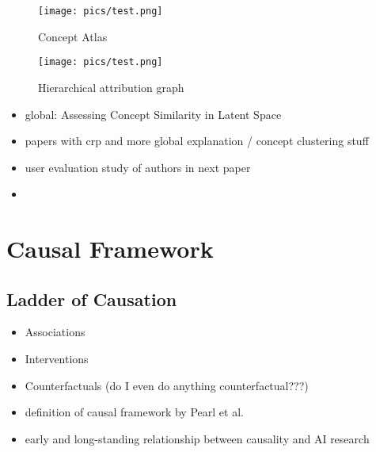 \begin{figure}[htbp]
    \centering
	\texttt{[image: pics/test.png]}
    \caption{Concept Atlas}
    \label{fig:concept_atlas}
\end{figure}

\begin{figure}[htbp]
    \centering
	\texttt{[image: pics/test.png]}
    \caption{Hierarchical attribution graph}
    \label{fig:attr_graph}
\end{figure}

\begin{itemize}
    \item global: Assessing Concept Similarity in Latent Space
    \item papers with crp and more global explanation / concept clustering stuff 
\cite{Vielhaben2022,Vielhaben2023,Dreyer2023,Dreyer2023a,Fel2023,Fel2023a,Pahde2023}
    \item user evaluation study of authors in next paper \cite{Achtibat2023}
    \item 
\end{itemize}


\section{Causal Framework}
\subsection{Ladder of Causation}
\begin{itemize}
    \item Associations
    \item Interventions
    \item Counterfactuals (do I even do anything counterfactual???)
    \item definition of causal framework by Pearl et al. 
    \item early and long-standing relationship between causality and AI research
\end{itemize}

